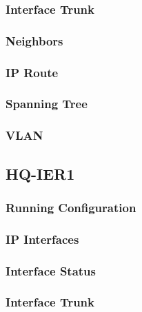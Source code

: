 \subsubsection{Interface Trunk}


\subsubsection{Neighbors}


\subsubsection{IP Route}


\subsubsection{Spanning Tree}


\subsubsection{VLAN}




\subsection{HQ-IER1}
\subsubsection{Running Configuration}


\subsubsection{IP Interfaces}


\subsubsection{Interface Status}


\subsubsection{Interface Trunk}


